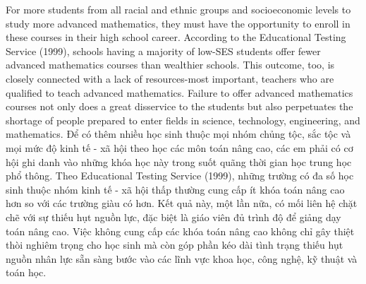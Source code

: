 \documentclass[
  10pt,
  a4paper,
  landscape,
  twoside,
  openany
]{scrbook}
\newcommand{\EN}[1]{#1}
\newcommand{\VI}[1]{#1}
\newcommand{\NOTE}[1]{#1}
\begin{document}
\TriPara
{
\EN{For more students from all racial and ethnic groups and socioeconomic levels to study more advanced mathematics, they must have the opportunity to enroll in these courses in their high school career. According to the Educational Testing Service (1999), schools having a majority of low-SES students offer fewer advanced mathematics courses than wealthier schools. This outcome, too, is closely connected with a lack of resources-most important, teachers who are qualified to teach advanced mathematics. Failure to offer advanced mathematics courses not only does a great disservice to the students but also perpetuates the shortage of people prepared to enter fields in science, technology, engineering, and mathematics.}
}
{
\VI{Để có thêm nhiều học sinh thuộc mọi nhóm chủng tộc, sắc tộc và mọi mức độ kinh tế - xã hội theo học các môn toán nâng cao, các em phải có cơ hội ghi danh vào những khóa học này trong suốt quãng thời gian học trung học phổ thông. Theo Educational Testing Service (1999), những trường có đa số học sinh thuộc nhóm kinh tế - xã hội thấp thường cung cấp ít khóa toán nâng cao hơn so với các trường giàu có hơn. Kết quả này, một lần nữa, có mối liên hệ chặt chẽ với sự thiếu hụt nguồn lực, đặc biệt là giáo viên đủ trình độ để giảng dạy toán nâng cao. Việc không cung cấp các khóa toán nâng cao không chỉ gây thiệt thòi nghiêm trọng cho học sinh mà còn góp phần kéo dài tình trạng thiếu hụt nguồn nhân lực sẵn sàng bước vào các lĩnh vực khoa học, công nghệ, kỹ thuật và toán học.}
}
{
\NOTE{}
}
\end{document}
